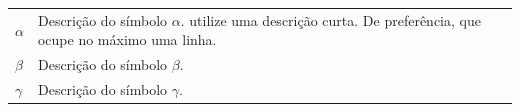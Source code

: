 

\begin{table}[!ht]
  \begin{tabular}{p{1cm}p{14cm}}
$\alpha$ & Descrição do símbolo $\alpha$. utilize uma descrição curta. De
preferência, que ocupe no máximo uma linha.\\
	$\beta$   & Descrição do símbolo $\beta$. \\
	$\gamma$  & Descrição do símbolo $\gamma$. 
  \end{tabular}
\end{table}